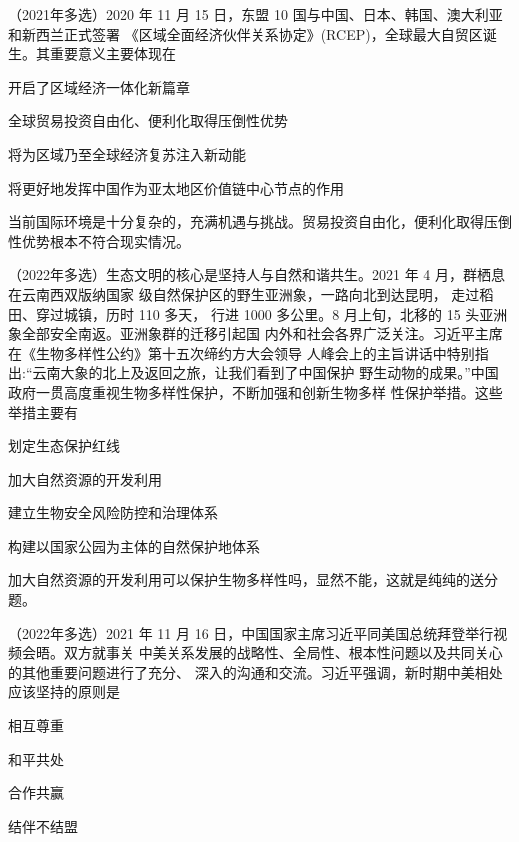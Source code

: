 \documentclass[lang=cn,newtx,10pt,scheme=chinese,pad,twocol]{zznote}
\begin{document}
\begin{example} （2021年多选）2020 年 11 月 15 日，东盟 10 国与中国、日本、韩国、澳大利亚和新西兰正式签署
	《区域全面经济伙伴关系协定》(RCEP)，全球最大自贸区诞生。其重要意义主要体现在
	\begin{choice}
		\item 开启了区域经济一体化新篇章
		\item 全球贸易投资自由化、便利化取得压倒性优势
		\item 将为区域乃至全球经济复苏注入新动能
		\item 将更好地发挥中国作为亚太地区价值链中心节点的作用
	\end{choice}
\end{example}
\begin{solution}
	当前国际环境是十分复杂的，充满机遇与挑战。贸易投资自由化，便利化取得压倒性优势根本不符合现实情况。
\end{solution}
\begin{example}	（2022年多选）生态文明的核心是坚持人与自然和谐共生。2021 年 4 月，群栖息在云南西双版纳国家
	级自然保护区的野生亚洲象，一路向北到达昆明， 走过稻田、穿过城镇，历时 110 多天，
	行进 1000 多公里。8 月上旬，北移的 15 头亚洲象全部安全南返。亚洲象群的迁移引起国
	内外和社会各界广泛关注。习近平主席在《生物多样性公约》第十五次缔约方大会领导
	人峰会上的主旨讲话中特别指出:“云南大象的北上及返回之旅，让我们看到了中国保护
	野生动物的成果。”中国政府一贯高度重视生物多样性保护，不断加强和创新生物多样
	性保护举措。这些举措主要有

	\begin{choice}
		\item 划定生态保护红线
		\item 加大自然资源的开发利用
		\item 建立生物安全风险防控和治理体系
		\item 构建以国家公园为主体的自然保护地体系
	\end{choice}
\end{example}
\begin{solution}
	加大自然资源的开发利用可以保护生物多样性吗，显然不能，这就是纯纯的送分题。
\end{solution}
\begin{example} （2022年多选）2021 年 11 月 16 日，中国国家主席习近平同美国总统拜登举行视频会晤。双方就事关
	中美关系发展的战略性、全局性、根本性问题以及共同关心的其他重要问题进行了充分、
	深入的沟通和交流。习近平强调，新时期中美相处应该坚持的原则是
	\begin{choice}
		\item 相互尊重
		\item 和平共处
		\item 合作共赢
		\item 结伴不结盟
	\end{choice}
\end{example}
\end{document}
